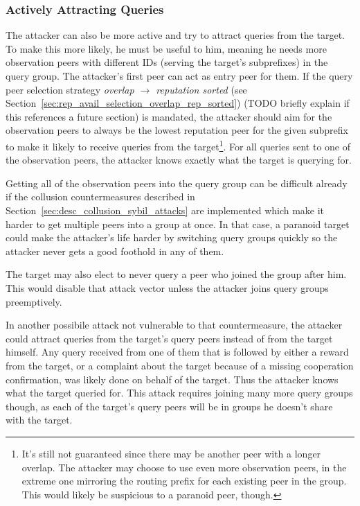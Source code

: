 \subsubsection{Actively Attracting Queries}
The attacker can also be more active and try to attract queries from the target.
To make this more likely, he must be useful to him, meaning he needs more
observation peers with different IDs (serving the target's subprefixes) in the
query group. The attacker's first peer can act as entry peer for them. If the
query peer selection strategy \emph{overlap $\rightarrow$ reputation sorted}
(see Section~\ref{sec:rep_avail_selection_overlap_rep_sorted}) (TODO briefly
explain if this references a future section) is mandated, the attacker should
aim for the observation peers to always be the lowest reputation peer for the
given subprefix to make it likely to receive queries from the
target\footnote{It's still not guaranteed since there may be another peer with a
longer overlap. The attacker may choose to use even more observation peers, in
the extreme one mirroring the routing prefix for each existing peer in the
group. This would likely be suspicious to a paranoid peer, though.}. For all
queries sent to one of the observation peers, the attacker knows exactly what
the target is querying for.

Getting all of the observation peers into the query group can be difficult
already if the collusion countermeasures described in
Section~\ref{sec:desc_collusion_sybil_attacks} are implemented which make it
harder to get multiple peers into a group at once. In that case, a paranoid
target could make the attacker's life harder by switching query groups quickly
so the attacker never gets a good foothold in any of them.

The target may also elect to never query a peer who joined the group after him.
This would disable that attack vector unless the attacker joins query groups
preemptively.

In another possibile attack not vulnerable to that countermeasure, the attacker
could attract queries from the target's query peers instead of from the target
himself. Any query received from one of them that is followed by either a reward
from the target, or a complaint about the target because of a missing
cooperation confirmation, was likely done on behalf of the target. Thus the
attacker knows what the target queried for. This attack requires joining many
more query groups though, as each of the target's query peers will be in groups
he doesn't share with the target.

